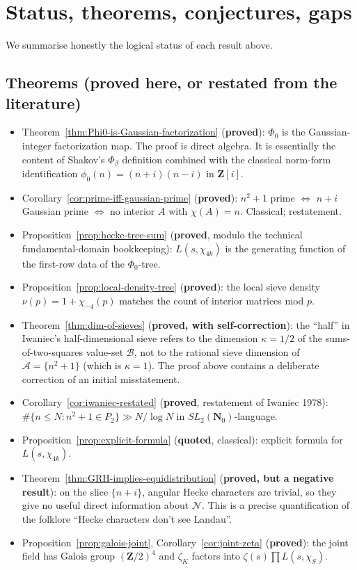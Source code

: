 \documentclass[11pt]{article}
\theoremstyle{definition}
\newcommand{\Nz}{\mathbf{N}_0}
\newcommand{\Z}{\mathbf{Z}}
\newcommand{\SLNz}{SL_2(\Nz)}
\begin{document}
\section{Status, theorems, conjectures, gaps}\label{sec:status}

We summarise honestly the logical status of each result above.

\subsection*{Theorems (proved here, or restated from the literature)}

\begin{itemize}
\item Theorem~\ref{thm:Phi0-is-Gaussian-factorization} (\textbf{proved}): $\Phi_0$ is the
Gaussian-integer factorization map. The proof is direct algebra. It is essentially the
content of Shakov's $\Phi_\beta$ definition combined with the classical norm-form
identification $\phi_0(n) = (n+i)(n-i)$ in $\Z[i]$.
\item Corollary~\ref{cor:prime-iff-gaussian-prime} (\textbf{proved}): $n^2+1$ prime
$\iff$ $n+i$ Gaussian prime $\iff$ no interior $A$ with $\chi(A) = n$. Classical;
restatement.
\item Proposition~\ref{prop:hecke-tree-sum} (\textbf{proved}, modulo the technical
fundamental-domain bookkeeping): $L(s,\chi_{4k})$ is the generating function of the
first-row data of the $\Phi_0$-tree.
\item Proposition~\ref{prop:local-density-tree} (\textbf{proved}): the local sieve density
$\nu(p) = 1 + \chi_{-4}(p)$ matches the count of interior matrices mod $p$.
\item Theorem~\ref{thm:dim-of-sieves} (\textbf{proved, with self-correction}): the
``half'' in Iwaniec's half-dimensional sieve refers to the dimension $\kappa = 1/2$
of the sums-of-two-squares value-set $\mathcal{B}$, not to the rational sieve dimension
of $\mathcal{A} = \{n^2+1\}$ (which is $\kappa = 1$). The proof above contains a deliberate
correction of an initial misstatement.
\item Corollary~\ref{cor:iwaniec-restated} (\textbf{proved}, restatement of Iwaniec
1978): $\#\{n \le N : n^2+1 \in P_2\} \gg N/\log N$ in $\SLNz$-language.
\item Proposition~\ref{prop:explicit-formula} (\textbf{quoted}, classical): explicit
formula for $L(s,\chi_{4k})$.
\item Theorem~\ref{thm:GRH-implies-equidistribution} (\textbf{proved, but a negative
result}): on the slice $\{n+i\}$, angular Hecke characters are trivial, so they give no
useful direct information about $\mathcal{N}$. This is a precise quantification of the
folklore ``Hecke characters don't see Landau''.
\item Proposition~\ref{prop:galois-joint}, Corollary~\ref{cor:joint-zeta}
(\textbf{proved}): the joint field has Galois group $(\Z/2)^4$ and $\zeta_K$ factors
into $\zeta(s)\prod L(s,\chi_S)$.
\end{itemize}
\end{document}
